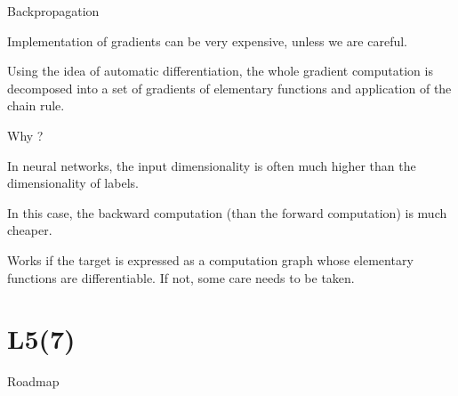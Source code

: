\documentclass[handout,fleqn,aspectratio=169]{beamer}
\begin{document}
\begin{frame}{Backpropagation}

\plitemsep 0.1in

\bci 

\item Implementation of gradients can be very expensive, unless we are careful. 

\item Using the idea of automatic differentiation, the whole gradient computation is decomposed into a set of gradients of elementary functions and application of the chain rule.

\item Why ? 

\bci
\item In neural networks, the input dimensionality is often much higher than the dimensionality of labels.
\item In this case, the backward computation (than the forward computation) is much cheaper. 
\eci

\item Works if the target is expressed as a computation graph whose elementary functions are differentiable. If not, some care needs to be taken. 
\eci
\end{frame}

\section{L5(7)}
\begin{frame}{Roadmap}

\plitemsep 0.1in

\bce[(1)] 
\item {}

\item {}

\item {} 

\item {} 

\item {} 

\item {} 

\item {}

\ece
\end{frame}
\end{document}
